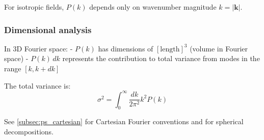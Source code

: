 For isotropic fields, $P(k)$ depends only on wavenumber magnitude $k = |\mathbf{k}|$.


\subsubsection{Dimensional analysis}

In 3D Fourier space:
- $P(k)$ has dimensions of $[\text{length}]^3$ (volume in Fourier space)
- $P(k) \, dk$ represents the contribution to total variance from modes in the range $[k, k+dk]$

The total variance is:
\begin{equation}
\sigma^2 = \int_0^\infty \frac{dk}{2\pi^2} k^2 P(k)
\end{equation}

See \cref{subsec:ps_cartesian} for Cartesian Fourier conventions and  for spherical decompositions.
